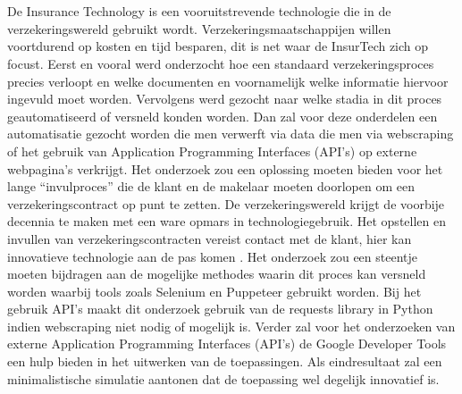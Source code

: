 
\chapter{}
\label{ch:inleiding}

De Insurance Technology is een vooruitstrevende technologie die in de verzekeringswereld gebruikt wordt. Verzekeringsmaatschappijen willen voortdurend op kosten en tijd besparen, dit is net waar de InsurTech zich op focust. Eerst en vooral werd onderzocht hoe een standaard verzekeringsproces precies verloopt en welke documenten en voornamelijk welke informatie hiervoor ingevuld moet worden. Vervolgens werd gezocht naar welke stadia in dit proces geautomatiseerd of versneld konden worden. Dan zal voor deze onderdelen een automatisatie gezocht worden die men verwerft via data die men via webscraping of het gebruik van Application Programming Interfaces (API’s) op externe webpagina’s verkrijgt. Het onderzoek zou een oplossing moeten bieden voor het lange “invulproces” die de klant en de makelaar moeten doorlopen om een verzekeringscontract op punt te zetten. De verzekeringswereld krijgt de voorbije decennia te maken met een ware opmars in technologiegebruik. Het opstellen en invullen van verzekeringscontracten vereist contact met de klant, hier kan innovatieve technologie aan de pas komen . Het onderzoek zou een steentje moeten bijdragen aan de mogelijke methodes waarin dit proces kan versneld worden waarbij tools zoals Selenium en Puppeteer gebruikt worden. Bij het gebruik API’s maakt dit onderzoek gebruik van de requests library in Python indien webscraping niet nodig of mogelijk is. Verder zal voor het onderzoeken van externe Application Programming Interfaces (API’s) de Google Developer Tools een hulp bieden in het uitwerken van de toepassingen. Als eindresultaat zal een minimalistische simulatie aantonen dat de toepassing wel degelijk innovatief is.

\section{}
\label{sec:probleemstelling}

